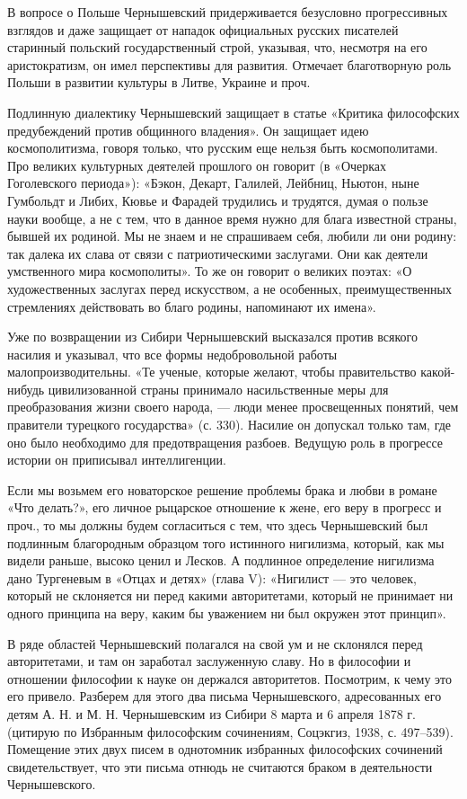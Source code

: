 В вопросе о Польше Чернышевский придерживается безусловно
прогрессивных взглядов и даже защищает от нападок официальных русских
писателей старинный польский государственный строй, указывая, что,
несмотря на его аристократизм, он имел перспективы для развития.
Отмечает благотворную роль Польши в развитии культуры в Литве, Украине
и проч.

Подлинную диалектику Чернышевский защищает в статье «Критика философских
предубеждений против общинного владения». Он защищает идею космополитизма,
говоря только, что русским еще нельзя быть космополитами. Про великих
культурных деятелей прошлого он говорит (в «Очерках Гоголевского периода»):
«Бэкон, Декарт, Галилей, Лейбниц, Ньютон, ныне Гумбольдт и Либих, Кювье и
Фарадей трудились и трудятся, думая о пользе науки вообще, а не с тем, что в
данное время нужно для блага известной страны, бывшей их родиной. Мы не знаем и
не спрашиваем себя, любили ли они родину: так далека их слава от связи с
патриотическими заслугами. Они как деятели умственного мира космополиты». То же
он говорит о великих поэтах: «О художественных заслугах перед искусством, а не
особенных, преимущественных стремлениях действовать во благо родины, напоминают
их имена».

Уже по возвращении из Сибири Чернышевский высказался против всякого насилия и
указывал, что все формы недобровольной работы малопроизводительны. «Те ученые,
которые желают, чтобы правительство какой-нибудь цивилизованной страны
принимало насильственные меры для преобразования жизни своего народа, --- люди
менее просвещенных понятий, чем правители турецкого государства» (с. 330).
Насилие он допускал только там, где оно было необходимо для предотвращения
разбоев. Ведущую роль в прогрессе истории он приписывал интеллигенции.

Если мы возьмем его новаторское решение проблемы брака и любви в романе «Что
делать?», его личное рыцарское отношение к жене, его веру в прогресс и проч.,
то мы должны будем согласиться с тем, что здесь Чернышевский был подлинным
благородным образцом того истинного нигилизма, который, как мы видели раньше,
высоко ценил и Лесков. А подлинное определение нигилизма дано Тургеневым в
«Отцах и детях» (глава V): «Нигилист --- это человек, который не склоняется ни
перед какими авторитетами, который не принимает ни одного принципа на веру,
каким бы уважением ни был окружен этот принцип».

В ряде областей Чернышевский полагался на свой ум и не склонялся перед
авторитетами, и там он заработал заслуженную славу. Но в философии и отношении
философии к науке он держался авторитетов. Посмотрим, к чему это его привело.
Разберем для этого два письма Чернышевского, адресованных его детям А. Н. и М.
Н. Чернышевским из Сибири 8 марта и 6 апреля 1878 г. (цитирую по Избранным
философским сочинениям, Соцэкгиз, 1938, с. 497--539). Помещение этих двух писем
в однотомник избранных философских сочинений свидетельствует, что эти письма
отнюдь не считаются браком в деятельности Чернышевского.


